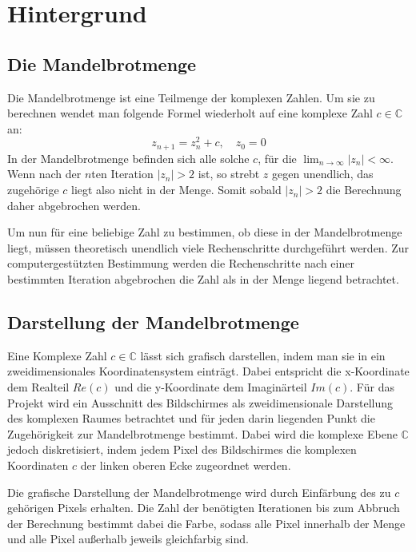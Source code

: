 \section{Hintergrund}

\subsection{Die Mandelbrotmenge}
Die Mandelbrotmenge ist eine Teilmenge der komplexen Zahlen.
Um sie zu berechnen wendet man folgende Formel wiederholt auf eine komplexe Zahl $c \in \mathbb{C}$ an:
\begin{equation}\label{equ:mandelbrot}
	z_{n+1} = z_{n}^2 + c, \quad z_0 = 0
\end{equation}
In der Mandelbrotmenge befinden sich alle solche $c$, für die \( \lim_{n \rightarrow \infty} |z_n| < \infty \).
Wenn nach der \( n \)ten Iteration \( |z_n| > 2 \) ist, so strebt $z$ gegen unendlich, das zugehörige $c$ liegt also nicht in der Menge.
Somit sobald $|z_n| > 2$ die Berechnung daher abgebrochen werden\cite{424331}.

Um nun für eine beliebige Zahl zu bestimmen, ob diese in der Mandelbrotmenge liegt, müssen
theoretisch unendlich viele Rechenschritte durchgeführt werden. Zur computergestützten Bestimmung
werden die Rechenschritte nach einer bestimmten Iteration abgebrochen die Zahl als in der Menge liegend betrachtet.

\subsection{Darstellung der Mandelbrotmenge}
Eine Komplexe Zahl \( c \in \mathbb{C} \) lässt sich grafisch darstellen, indem man sie in ein zweidimensionales Koordinatensystem einträgt.
Dabei entspricht die x-Koordinate dem Realteil \( Re(c) \) und die y-Koordinate dem Imaginärteil \( Im(c) \).
Für das Projekt wird ein Ausschnitt des Bildschirmes als zweidimensionale Darstellung des komplexen Raumes
betrachtet und für jeden darin liegenden Punkt die Zugehörigkeit zur Mandelbrotmenge bestimmt.
Dabei wird die komplexe Ebene \( \mathbb{C} \) jedoch diskretisiert, indem jedem Pixel des Bildschirmes die komplexen Koordinaten $c$
der linken oberen Ecke zugeordnet werden.

Die grafische Darstellung der Mandelbrotmenge wird durch Einfärbung des zu $c$ gehörigen Pixels erhalten.
Die Zahl der benötigten Iterationen bis zum Abbruch der Berechnung bestimmt dabei die Farbe, sodass alle Pixel
innerhalb der Menge und alle Pixel außerhalb jeweils gleichfarbig sind.

